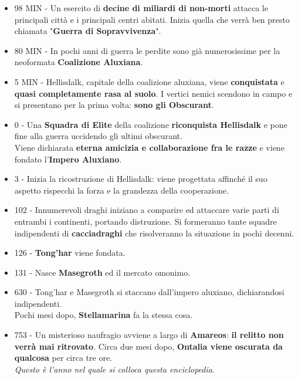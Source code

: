 \documentclass[10pt,twoside,onecolumn,openany]{book}
\begin{document}
\begin{multicols}{2}
\begin{itemize}
\item 98 MIN - Un esercito di \textbf{decine di miliardi di non-morti} attacca le principali città e i principali centri abitati. Inizia quella che verrà ben presto chiamata "\textbf{Guerra di Sopravvivenza}".\\
\item 80 MIN - In pochi anni di guerra le perdite sono già numerosissime per la neoformata \textbf{Coalizione Aluxiana}.\\
\item 5 MIN - Hellisdalk, capitale della coalizione aluxiana, viene \textbf{conquistata} e \textbf{quasi completamente rasa al suolo}. I vertici nemici scendono in campo e si presentano per la prima volta: \textbf{sono gli Obscurant}.\\
\item 0 - Una \textbf{Squadra di Elite} della coalizione \textbf{riconquista Hellisdalk} e pone fine alla guerra uccidendo gli ultimi obscurant.\\
Viene dichiarata \textbf{eterna amicizia e collaborazione fra le razze} e viene fondato l'\textbf{Impero Aluxiano}.\\
\item 3 - Inizia la ricostruzione di Hellisdalk: viene progettata affinché il suo aspetto rispecchi la forza e la grandezza della cooperazione.\\
\item 102 - Innumerevoli draghi iniziano a comparire ed attaccare varie parti di entrambi i continenti, portando distruzione. Si formeranno tante squadre indipendenti di \textbf{cacciadraghi} che risolveranno la situazione in pochi decenni.\\
\item 126 - \textbf{Tong'har} viene fondata.\\
\item 131 - Nasce \textbf{Masegroth} ed il mercato omonimo.\\
\item 630 - Tong'har e Masegroth si staccano dall'impero aluxiano, dichiarandosi indipendenti.\\ Pochi mesi dopo, \textbf{Stellamarina} fa la stessa cosa.\\
\item 753 - Un misterioso naufragio avviene a largo di \textbf{Amareos}: \textbf{il relitto non verrà mai ritrovato}. Circa due mesi dopo, \textbf{Ontalia viene oscurata da qualcosa} per circa tre ore.\\ \textit{Questo è l'anno nel quale si colloca questa enciclopedia}.\\
\end{itemize}
\end{multicols}
\newpage
\end{document}

